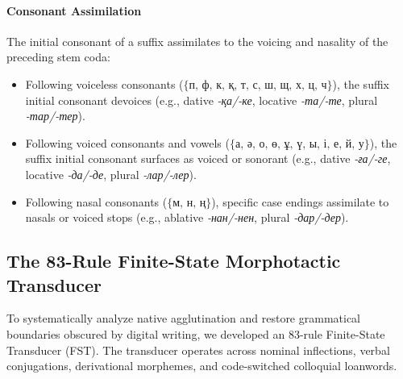 \paragraph{Consonant Assimilation}
The initial consonant of a suffix assimilates to the voicing and nasality of the preceding stem coda:
\begin{itemize}
    \item Following voiceless consonants ($\{\text{п, ф, к, қ, т, с, ш, щ, х, ц, ч}\}$), the suffix initial consonant devoices (e.g., dative \textit{-қа/-ке}, locative \textit{-та/-те}, plural \textit{-тар/-тер}).
    \item Following voiced consonants and vowels ($\{\text{а, ә, о, ө, ұ, ү, ы, і, е, й, у}\}$), the suffix initial consonant surfaces as voiced or sonorant (e.g., dative \textit{-ға/-ге}, locative \textit{-да/-де}, plural \textit{-лар/-лер}).
    \item Following nasal consonants ($\{\text{м, н, ң}\}$), specific case endings assimilate to nasals or voiced stops (e.g., ablative \textit{-нан/-нен}, plural \textit{-дар/-дер}).
\end{itemize}

\subsection{The 83-Rule Finite-State Morphotactic Transducer}
To systematically analyze native agglutination and restore grammatical boundaries obscured by digital writing, we developed an 83-rule Finite-State Transducer (FST). The transducer operates across nominal inflections, verbal conjugations, derivational morphemes, and code-switched colloquial loanwords.

